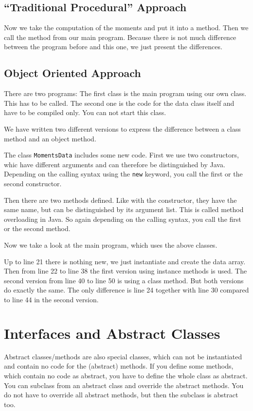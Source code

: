\subsection{``Traditional Procedural'' Approach}
Now we take the computation of the moments and put it into
a method. Then we call the method from our main program. 
Because there is not much difference between the program before
and this one, we just present the differences.




\subsection{Object Oriented Approach}
There are two programs: The first class is
the main program using our own class. This has to be called.
The second one is the
code for the data class itself and have to be compiled only. You can
not start this class. 

We have written two different 
versions to express the difference between a class method and 
an object method.

The class \verb|MomentsData| includes some new code. First
we use two constructors, whic have different arguments and can
therefore be distinguished by Java. Depending on the calling
syntax using the \verb|new| keyword, you call the first or the second
constructor. 

Then there are two methods defined. Like with the constructor, they
have the same name, but can be distinguished by its argument list.
This is called method overloading in Java. So again depending on
the calling syntax, you call the first or the second method.

Now we take a look at the main program, which uses the above classes.

Up to line 21 there is nothing new, we just instantiate and create
the data array. Then from line 22 to line 38 the first version using
instance methods is used. The second version from line 40 to line 50
is using a class method. But both versions do exactly the same.
The only difference is line 24 together with line 30 compared to 
line 44 in the second version.
 


\section{Interfaces and Abstract Classes}
Abstract classes/methods 
are also special classes, which can not be instantiated
and contain no code for the (abstract) methods. If you define
some methods, which contain no code as abstract, you have to 
define the whole class as abstract. You can subclass from an 
abstract class and override the abstract methods. You do not have
to override all abstract methods, but then the subclass is abstract
too.

